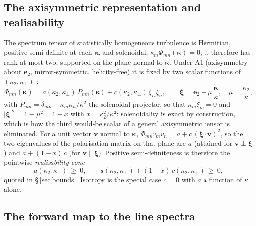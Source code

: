 \documentclass[lineno]{JFM-FLM_Au}
\begin{document}
\subsection{The axisymmetric representation and realisability}
\label{app:twoscalar}

The spectrum tensor of statistically homogeneous turbulence is Hermitian,
positive semi-definite at each $\boldsymbol{\kappa}$, and solenoidal,
$\kappa_m\Phi_{mn}(\boldsymbol{\kappa})=0$; it therefore has rank at most
two, supported on the plane normal to $\boldsymbol{\kappa}$. Under A1
(axisymmetry about $\boldsymbol{e}_2$, mirror-symmetric, helicity-free) it
is fixed by two scalar functions of $(\kappa_2,\kappa_\perp)$
\citep{Batchelor1946,ChandrasekharAxisym1950,Lindborg1995}:
\begin{equation}
  \Phi_{mn}(\boldsymbol{\kappa})
  = a(\kappa_2,\kappa_\perp)\,P_{mn}(\boldsymbol{\kappa})
  + c(\kappa_2,\kappa_\perp)\,\xi_m\xi_n,
  \qquad
  \boldsymbol{\xi} = \boldsymbol{e}_2 - \mu\,
  \frac{\boldsymbol{\kappa}}{\kappa},
  \quad \mu=\frac{\kappa_2}{\kappa},
  \label{eq:twoscalar}
\end{equation}
with $P_{mn}=\delta_{mn}-\kappa_m\kappa_n/\kappa^2$ the solenoidal
projector, so that $\kappa_m\xi_m=0$ and
$|\boldsymbol{\xi}|^2=1-\mu^2=1-x$ with $x=\kappa_2^2/\kappa^2$:
solenoidality is exact by construction, which is how the third would-be
scalar of a general axisymmetric tensor is eliminated. For a unit vector
$\boldsymbol{v}$ normal to $\boldsymbol{\kappa}$,
$\Phi_{mn}v_mv_n = a + c\,(\boldsymbol{\xi}\cdot\boldsymbol{v})^2$, so the
two eigenvalues of the polarisation matrix on that plane are $a$ (attained
for $\boldsymbol{v}\perp\boldsymbol{\xi}$) and $a+(1-x)\,c$ (for
$\boldsymbol{v}\parallel\boldsymbol{\xi}$). Positive semi-definiteness is
therefore the pointwise \emph{realisability cone}
\begin{equation}
  a(\kappa_2,\kappa_\perp)\ \ge\ 0,
  \qquad
  a(\kappa_2,\kappa_\perp) + (1-x)\,c(\kappa_2,\kappa_\perp)\ \ge\ 0 ,
  \label{eq:cone}
\end{equation}
quoted in \S\,\ref{sec:bounds}. Isotropy is the special case $c=0$ with
$a$ a function of $\kappa$ alone.

\subsection{The forward map to the line spectra}\label{app:fwdmap}
\end{document}
